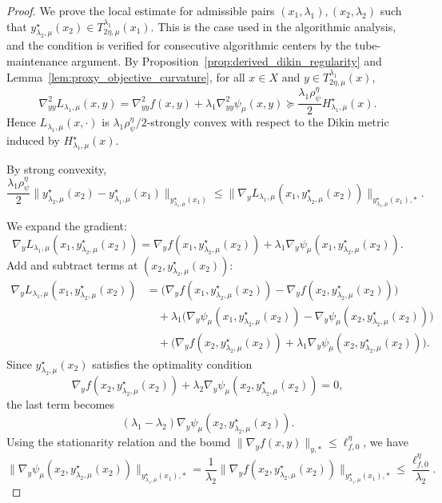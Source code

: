 \documentclass{article}
\begin{document}
\begin{proof}
We prove the local estimate for admissible pairs
\((x_1,\lambda_1),(x_2,\lambda_2)\) such that
\(y^\star_{\lambda_2,\mu}(x_2)\in T_{2\eta,\mu}^{\lambda_1}(x_1)\). This is the case used in the
algorithmic analysis, and the condition is verified for consecutive algorithmic centers by the
tube-maintenance argument. By Proposition~\ref{prop:derived_dikin_regularity} and
Lemma~\ref{lem:proxy_objective_curvature}, for all \(x\in X\) and
\(y\in T_{2\eta,\mu}^{\lambda_1}(x)\),
\[
\nabla^2_{yy}L_{\lambda_1,\mu}(x,y)
=
\nabla^2_{yy} f(x,y)+\lambda_1\nabla^2_{yy}\psi_\mu(x,y)
\succeq
\frac{\lambda_1\rho_\psi^\eta}{2}H_{\lambda_1,\mu}^\star(x).
\]
Hence \(L_{\lambda_1,\mu}(x,\cdot)\) is
\(\lambda_1\rho_\psi^\eta/2\)-strongly convex with respect to the Dikin metric induced by
\(H_{\lambda_1,\mu}^\star(x)\).

By strong convexity,
\[
\frac{\lambda_1\rho_\psi^\eta}{2}
\bigl\|
y_{\lambda_2,\mu}^\star(x_2)-y_{\lambda_1,\mu}^\star(x_1)
\bigr\|_{y_{\lambda_1,\mu}^\star(x_1)}
\le
\bigl\|
\nabla_y L_{\lambda_1,\mu}(x_1,y_{\lambda_2,\mu}^\star(x_2))
\bigr\|_{y_{\lambda_1,\mu}^\star(x_1),*}.
\]

We expand the gradient:
\[
\nabla_y L_{\lambda_1,\mu}(x_1,y_{\lambda_2,\mu}^\star(x_2))
=
\nabla_y f(x_1,y_{\lambda_2,\mu}^\star(x_2))
+
\lambda_1\nabla_y\psi_\mu(x_1,y_{\lambda_2,\mu}^\star(x_2)).
\]
Add and subtract terms at \((x_2,y_{\lambda_2,\mu}^\star(x_2))\):
\begin{align*}
\nabla_y L_{\lambda_1,\mu}(x_1,y_{\lambda_2,\mu}^\star(x_2))
&=
\bigl(
\nabla_y f(x_1,y_{\lambda_2,\mu}^\star(x_2))
-
\nabla_y f(x_2,y_{\lambda_2,\mu}^\star(x_2))
\bigr) \\
&\quad
+
\lambda_1
\bigl(
\nabla_y\psi_\mu(x_1,y_{\lambda_2,\mu}^\star(x_2))
-
\nabla_y\psi_\mu(x_2,y_{\lambda_2,\mu}^\star(x_2))
\bigr) \\
&\quad
+
\bigl(
\nabla_y f(x_2,y_{\lambda_2,\mu}^\star(x_2))
+
\lambda_1\nabla_y\psi_\mu(x_2,y_{\lambda_2,\mu}^\star(x_2))
\bigr).
\end{align*}
Since \(y_{\lambda_2,\mu}^\star(x_2)\) satisfies the optimality condition
\[
\nabla_y f(x_2,y_{\lambda_2,\mu}^\star(x_2))
+
\lambda_2\nabla_y\psi_\mu(x_2,y_{\lambda_2,\mu}^\star(x_2))
=0,
\]
the last term becomes
\[
(\lambda_1-\lambda_2)
\nabla_y\psi_\mu(x_2,y_{\lambda_2,\mu}^\star(x_2)).
\]
Using the stationarity relation and the bound
\(\|\nabla_y f(x,y)\|_{y,*}\le \ell_{f,0}^\eta\), we have
\[
\bigl\|
\nabla_y\psi_\mu(x_2,y_{\lambda_2,\mu}^\star(x_2))
\bigr\|_{y_{\lambda_1,\mu}^\star(x_1),*}
=
\frac{1}{\lambda_2}
\bigl\|
\nabla_y f(x_2,y_{\lambda_2,\mu}^\star(x_2))
\bigr\|_{y_{\lambda_1,\mu}^\star(x_1),*}
\le
\frac{\ell_{f,0}^\eta}{\lambda_2}.
\]


\end{proof}
\end{document}
